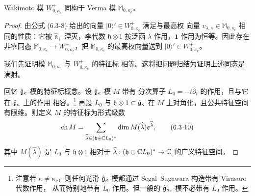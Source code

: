 \renewcommand{\theproposition}{6.3.3}
\begin{proposition}
    Wakimoto 模 $W^+_{0,\kappa_c}$ 同构于 Verma 模
    $\mathbb M_{0,\kappa_c}$。
\end{proposition}

\begin{proof}
    由公式 (6.3-8) 给出的向量 $|0\rangle'\in W^+_{0,\kappa_c}$ 满足与最高权
    向量 $v_{\lambda,\kappa}\in\mathbb M_{0,\kappa_c}$ 相同的性质：它被
    $\widehat{\mathfrak n}_+$ 湮灭，李代数 $\mathfrak h\otimes1$ 按泛函
    $\lambda$ 作用，$\mathbf 1$ 作用为恒等。因此存在非零同态
    $\mathbb M_{0,\kappa_c}\to W^+_{0,\kappa_c}$，把
    $\mathbb M_{0,\kappa_c}$ 的最高权向量送到 $|0\rangle'\in
    W^+_{0,\kappa_c}$。

    我们先证明模 $\mathbb M_{0,\kappa_c}$ 与 $W^+_{0,\kappa_c}$ 的特征标
    相等。这将把问题归结为证明上述同态是满射。

    回忆 $\hat{\mathfrak{g}}_\kappa$-模的特征标概念。设 $\hat{\mathfrak{g}}_\kappa$-模 $M$ 带有
    分次算子 $L_0=-t\partial_t$ 的作用，且与它在 $\hat{\mathfrak{g}}_\kappa$ 上的作用
    相容。\footnote{注意若 $\kappa\ne\kappa_c$，则任何光滑
    $\hat{\mathfrak{g}}_\kappa$-模都通过 Segal--Sugawara 构造带有 Virasoro 代数作用，
    从而特别地带有 $L_0$ 作用。但一般的 $\hat{\mathfrak{g}}_{\kappa_c}$-模不必带有
    $L_0$ 作用。} 再设 $L_0$ 与 $\mathfrak h\otimes1\subset\hat{\mathfrak{g}}_\kappa$
    在 $M$ 上对角化，且公共特征空间有限维。则定义 $M$ 的特征标为形式级数
    \begin{equation}
        \mathrm{ch}\,M=\sum_{\widehat\lambda\in
        (\mathfrak h\oplus\mathbb{C} L_0)^*}\dim M(\widehat\lambda)
        e^{\widehat\lambda},
        \tag{6.3-10}
    \end{equation}
    其中 $M(\widehat\lambda)$ 是 $L_0$ 与 $\mathfrak h\otimes1$ 相对于
    $\widehat\lambda:(\mathfrak h\oplus\mathbb{C} L_0)^*\to\mathbb{C}$ 的广义特征空间。


\end{proof}
